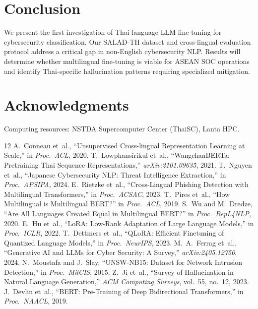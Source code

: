 \documentclass[journal]{IEEEtran}
\begin{document}
\section{Conclusion}
We present the first investigation of Thai-language LLM fine-tuning for cybersecurity classification. Our SALAD-TH dataset and cross-lingual evaluation protocol address a critical gap in non-English cybersecurity NLP. Results will determine whether multilingual fine-tuning is viable for ASEAN SOC operations and identify Thai-specific hallucination patterns requiring specialized mitigation.

\section*{Acknowledgments}
Computing resources: NSTDA Supercomputer Center (ThaiSC), Lanta HPC.
\begin{thebibliography}{12}
 A.~Conneau et~al., ``Unsupervised Cross-lingual Representation Learning at Scale,'' in \emph{Proc.\ ACL}, 2020.
 T.~Lowphansirikul et~al., ``WangchanBERTa: Pretraining Thai Sequence Representations,'' \emph{arXiv:2101.09635}, 2021.
 T.~Nguyen et~al., ``Japanese Cybersecurity NLP: Threat Intelligence Extraction,'' in \emph{Proc.\ APSIPA}, 2024.
 E.~Rietzke et~al., ``Cross-Lingual Phishing Detection with Multilingual Transformers,'' in \emph{Proc.\ ACSAC}, 2023.
 T.~Pires et~al., ``How Multilingual is Multilingual BERT?'' in \emph{Proc.\ ACL}, 2019.
 S.~Wu and M.~Dredze, ``Are All Languages Created Equal in Multilingual BERT?'' in \emph{Proc.\ RepL4NLP}, 2020.
 E.~Hu et~al., ``LoRA: Low-Rank Adaptation of Large Language Models,'' in \emph{Proc.\ ICLR}, 2022.
 T.~Dettmers et~al., ``QLoRA: Efficient Finetuning of Quantized Language Models,'' in \emph{Proc.\ NeurIPS}, 2023.
 M.~A.~Ferrag et~al., ``Generative AI and LLMs for Cyber Security: A Survey,'' \emph{arXiv:2405.12750}, 2024.
 N.~Moustafa and J.~Slay, ``UNSW-NB15: Dataset for Network Intrusion Detection,'' in \emph{Proc.\ MilCIS}, 2015.
 Z.~Ji et~al., ``Survey of Hallucination in Natural Language Generation,'' \emph{ACM Computing Surveys}, vol.~55, no.~12, 2023.
 J.~Devlin et~al., ``BERT: Pre-Training of Deep Bidirectional Transformers,'' in \emph{Proc.\ NAACL}, 2019.
\end{thebibliography}
\balance
\end{document}
